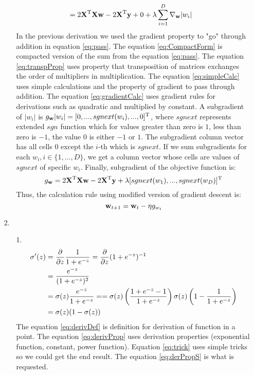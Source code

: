 \documentclass[10pt,a4paper]{article}
\begin{document}
\begin{enumerate}
\begin{enumerate}
\begin{align}
	&= 2\textbf{\text{{X}}} ^ \text{T}\textbf{\text{{X}}}\textbf{\text{{w}}} - 2\textbf{\text{{X}}} ^ \text{T}\textbf{\text{{y}}} + 0 + \lambda \sum_{i=1}^D \nabla_{\textbf{\text{{w}}}} |w_i| \label{eq:gradientCalc}
\end{align}
In the previous derivation we used the gradient property to "go" through addition in equation \ref{eq:pass}. The equation \ref{eq:CompactForm} is compacted version of the sum from the equation \ref{eq:pass}. The equation \ref{eq:transpProp} uses property that transposition of matrices exchanges the order of multipliers in multiplication. The equation \ref{eq:simpleCalc} uses simple calculations and the property of gradient to pass through addition. The equation \ref{eq:gradientCalc} uses gradient rules for derivations such as quadratic and multiplied by constant.
A subgradient of $|w_i|$ is $g_{\textbf{\text{{w}}}}|w_i| = [0, ..., sgnext(w_i), ..., 0]^\text{T}$, where $sgnext$ represents extended $sgn$ function which for values greater than zero is $1$, less than zero is $-1$, the value 0 is either $-1$ or $1$. The subgradient column vector has all cells 0 except the $i$-th which is $sgnext$. If we sum subgradients for each $w_i, i\in \{ 1, ..., D\}$, we get a column vector whose cells are values of $sgnext$ of specific $w_i$. Finally, subgradient of the objective function is:
$$g_{\textbf{\text{{w}}}} = 2\textbf{\text{{X}}} ^ \text{T}\textbf{\text{{X}}}\textbf{\text{{w}}} - 2\textbf{\text{{X}}} ^ \text{T}\textbf{\text{{y}}} +\lambda [sgnext(w_1), ..., sgnext(w_D)]^\text{T} $$
Thus, the calculation rule using modified version of gradient descent is:
$$\textbf{\text{{w}}}_{t+1}=\textbf{\text{{w}}}_t - \eta g_{w_t}$$
  \end{enumerate}
\item[2.]
\begin{enumerate}
\item[1.]
\begin{align}
	\sigma'(z) &= \frac{\partial}{\partial z}\frac{1}{1 + e^{-z}} = \frac{\partial}{\partial z} (1+e^{-z})^{-1} \label{eq:derivDef} \\
			   &=  \frac{e^{-z}}{(1+e^{-z})^2} \label{eq:derivProp} \\
			   &= \sigma(z)\frac{e^{-z}}{1+e^{-z}} = 
			   = \sigma(z)\left(\frac{1 + e^{-z} - 1 }{1+e^{-z}}\right) 
			   \sigma(z)\left(1 - \frac{1}{1+e^{-z}}\right)  \label{eq:trick} \\
			   &= \sigma(z)(1 - \sigma(z)) \label{eq:derPropS}	
\end{align}
The equation \ref{eq:derivDef} is definition for derivation of function in a point. The equation \ref{eq:derivProp} uses derivation properties (exponential function, constant, power function). Equation \ref{eq:trick} uses simple tricks so we could get the end result. The equation \ref{eq:derPropS} is what is requested. 

\end{enumerate}
\end{enumerate}
\end{document}
